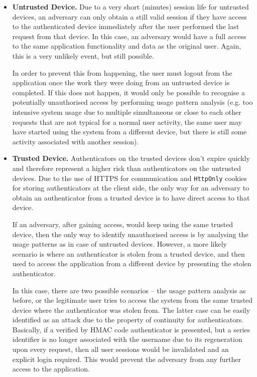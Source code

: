 \documentclass[a4paper,12pt,oneside,openright]{memoir}
\begin{document}
	\begin{itemize}
	\item\textbf{Untrusted Device.}
	Due to a very short (minutes) session life for untrusted devices, an adversary can only obtain a still valid session if they have access to the authenticated device immediately after the user performed the last request from that device.
	In this case, an adversary would have a full access to the same application functionality and data as the original user.
	Again, this is a very unlikely event, but still possible.

	In order to prevent this from happening, the user must logout from the application once the work they were doing from an untrusted device is completed.
	If this does not happen, it would only be possible to recognise a potentially unauthorised access by performing usage pattern analysis (e.g. too intensive system usage due to multiple simultaneous or close to each other requests that are not typical for a normal user activity, the same user may have started using the system from a different device, but there is still some activity associated with another session).

	\item\textbf{Trusted Device.}
	Authenticators on the trusted devices don't expire quickly and therefore represent a higher risk than authenticators on the untrusted devices.
	Due to the use of HTTPS for communication and \texttt{HttpOnly} cookies for storing authenticators at the client side, the only way for an adversary to obtain an authenticator from a trusted device is to have direct access to that device.

	If an adversary, after gaining access, would keep using the same trusted device, then the only way to identify unauthorised access is by analysing the usage patterns as in case of untrusted devices.
	However, a more likely scenario is where an authenticator is stolen from a trusted device, and then used to access the application from a different device by presenting the stolen authenticator.

	In this case, there are two possible scenarios -- the usage pattern analysis as before, or the legitimate user tries to access the system from the same trusted device where the authenticator was stolen from.
	The latter case can be easily identified as an attack due to the property of continuity for authenticators.
	Basically, if a verified by HMAC code authenticator is presented, but a series identifier is no longer associated with the username due to its regeneration upon every request, then all user sessions would be invalidated and an explicit login required.
	This would prevent the adversary from any further access to the application.
	\end{itemize}
\end{document}
